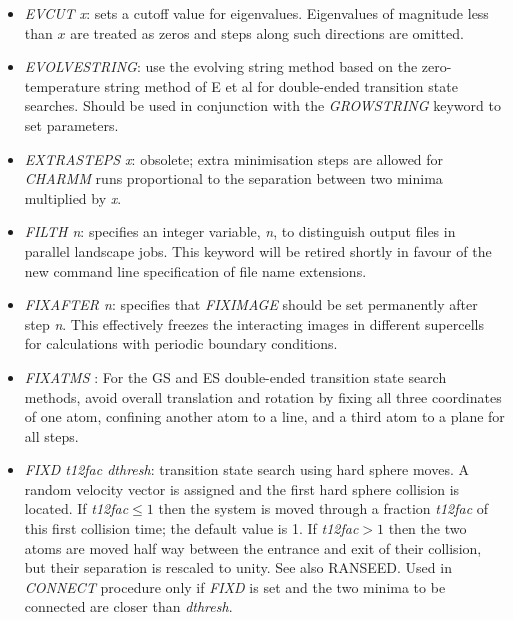 \documentclass[12pt,a4paper,dvips]{article}
\begin{document}
\begin{itemize}
\item {\it EVCUT x\/}: sets a cutoff value for eigenvalues. Eigenvalues
of magnitude less than $x$ are treated as zeros and steps along such directions
are omitted.

\item {\it EVOLVESTRING\/}: use the evolving string method based on the
  zero-temperature string method of E et al \cite{ERV02} for double-ended
  transition state searches. Should be used in conjunction with the {\it %
  GROWSTRING} keyword to set parameters. 

\item {\it EXTRASTEPS x\/}: obsolete; extra minimisation steps are allowed
for {\it CHARMM\/} runs proportional to the separation between two minima
multiplied by {\it x\/}.

 
\item {\it FILTH n\/}: specifies an integer variable, {\it n}, to distinguish output files in
parallel landscape jobs. This keyword will be retired shortly in favour of the new
command line specification of file name extensions.

\item {\it FIXAFTER n\/}: specifies that {\it FIXIMAGE\/} should be set permanently after step      
      {\it n\/}. This effectively freezes the interacting images in different supercells
      for calculations with periodic boundary conditions.

\item {\it FIXATMS \/}: For the GS and ES double-ended transition state search
  methods, avoid overall translation and rotation by fixing all three
  coordinates of one atom, confining another atom to a line, and a third atom
  to a plane for all steps.

\item {\it FIXD t12fac dthresh\/}: transition state search using hard sphere moves. A random
velocity vector is assigned and the first hard sphere collision is located. If {\it t12fac\/}$\le1$
then the system is moved through a fraction {\it t12fac\/} of this first collision time; the
default value is 1. If 
{\it t12fac\/}$>1$ then the two atoms are moved half way between the entrance and exit of their
collision, but their separation is rescaled to unity. See also RANSEED.
Used in {\it CONNECT\/} procedure only if {\it FIXD\/} is set and the two
minima to be connected are closer than {\it dthresh}.


\end{itemize}
\end{document}
